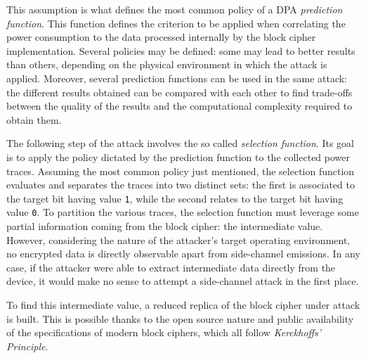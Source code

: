         This assumption is what defines the most common policy of a DPA \emph{prediction function}. This function defines the criterion to be applied when correlating the power consumption to the data processed internally by the block cipher implementation. Several policies may be defined: some may lead to better results than others, depending on the physical environment in which the attack is applied. Moreover, several prediction functions can be used in the same attack: the different results obtained can be compared with each other to find trade-offs between the quality of the results and the computational complexity required to obtain them. 
        
        
        The following step of the attack involves the so called \emph{selection function}. Its goal is to apply the policy dictated by the prediction function to the collected power traces. Assuming the most common policy just mentioned, the selection function evaluates and separates the traces into two distinct sets: the first is associated to the target bit having value \texttt{1}, while the second relates to the target bit having value \texttt{0}. To partition the various traces, the selection function must leverage some partial information coming from the block cipher: the intermediate value. However, considering the nature of the attacker's target operating environment, no encrypted data is directly observable apart from side-channel emissions. In any case, if the attacker were able to extract intermediate data directly from the device, it would make no sense to attempt a side-channel attack in the first place.

        To find this intermediate value, a reduced replica of the block cipher under attack is built. This is possible thanks to the open source nature and public availability of the specifications of modern block ciphers, which all follow \emph{Kerckhoffs’ Principle}.

